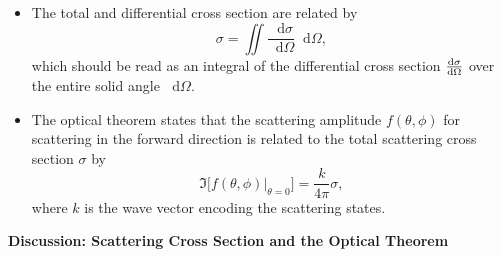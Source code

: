 \documentclass[11pt, a4paper]{article}
\newcommand{\diff}{\mathop{}\!\mathrm{d}} %
\begin{document}
\begin{itemize}
    \item The total and differential cross section are related by
    \begin{equation*}
        \sigma = \iint \frac{\diff \sigma}{\diff \Omega} \diff \Omega,
    \end{equation*}
    which should be read as an integral of the differential cross section $ \dv{\sigma}{\Omega} $ over the entire solid angle $ \diff \Omega $.

    \item The optical theorem states that the scattering amplitude $ f(\theta, \phi) $ for scattering in the forward direction is related to the total scattering cross section $ \sigma $ by
    \begin{equation*}
        \Im \big[ f(\theta, \phi)\big |_{\theta = 0} \big] = \frac{k}{4\pi} \sigma,
    \end{equation*}
    where $ k $ is the wave vector encoding the scattering states.
\end{itemize}

\textbf{Discussion: Scattering Cross Section and the Optical Theorem}
\end{document}
